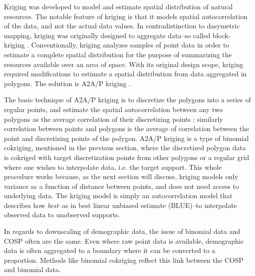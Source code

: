 \documentclass[]{interact}
\theoremstyle{plain}%
\theoremstyle{definition}
\theoremstyle{remark}
\begin{document}
Kriging was developed to model and estimate spatial distribution of natural resources.  The notable feature of kriging is that it models spatial autocorrelation of the data, and not the actual data values.  In contradistinction to dasymetric mapping, kriging was originally designed to aggregate data--so called block-kriging \citep{cressie90, matheron63}.  Conventionally, kriging analyzes samples of point data in order to estimate a complete spatial distribution for the purpose of summarizing the resources available over an area of space.  With its original design scope, kriging required modifications to estimate a spatial distribution from data aggregated in polygons.  The solution is A2A/P kriging \citep{krivoruchko11, kyriakidis04}.

The basic technique of A2A/P kriging is to discretize the polygons into a series of regular points, and estimate the spatial autocorrelation between any two polygons as the average correlation of their discretizing points \citep{kyriakidis04}; similarly correlation between points and polygons is the average of correlation between the point and discretizing points of the polygon.  A2A/P kriging is a type of binomial cokriging, mentioned in the previous section, where the discretized polygon data is cokriged with target discretization points from other polygons or a regular grid where one wishes to interpolate data, i.e. the target support.  This whole procedure works because, as the next section will discuss, kriging models only variance as a function of distance between points, and does not need access to underlying data.  The kriging model is simply an autocorrelation model that describes how {\em best}--as in best linear unbiased estimate (BLUE)--to interpolate observed data to unobserved supports.

In regards to downscaling of demographic data, the issue of binomial data and COSP often are the same.  Even where raw point data is available, demographic data is often aggregated to a boundary where it can be converted to a proportion.  Methods like binomial cokriging reflect this link between the COSP and binomial data.
\end{document}
